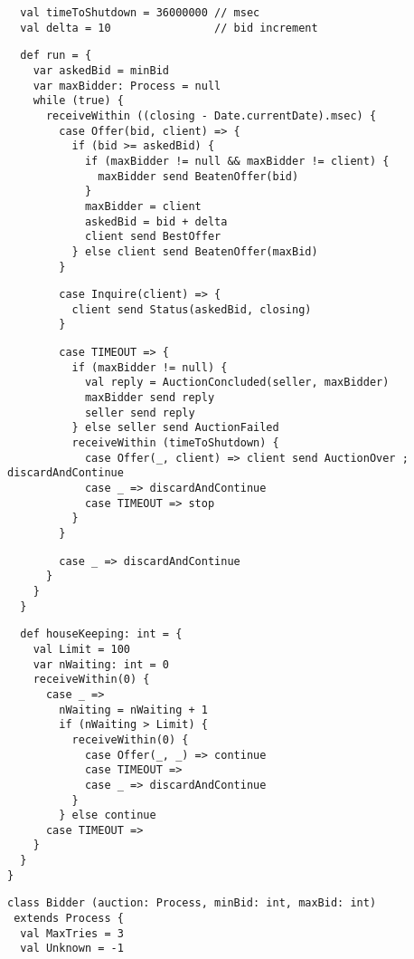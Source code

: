 \documentclass[a4paper,12pt,twoside,titlepage]{book}
\begin{document}
{{\begin{lstlisting}
  val timeToShutdown = 36000000 // msec
  val delta = 10                // bid increment
\end{lstlisting}
\begin{lstlisting}
  def run = {
    var askedBid = minBid
    var maxBidder: Process = null
    while (true) {
      receiveWithin ((closing - Date.currentDate).msec) {
        case Offer(bid, client) => {
          if (bid >= askedBid) {
            if (maxBidder != null && maxBidder != client) {
              maxBidder send BeatenOffer(bid)
            }
            maxBidder = client
            askedBid = bid + delta
            client send BestOffer
          } else client send BeatenOffer(maxBid)
        }
\end{lstlisting}
\begin{lstlisting}
        case Inquire(client) => {
          client send Status(askedBid, closing)
        }
\end{lstlisting}
\begin{lstlisting}
        case TIMEOUT => {
          if (maxBidder != null) {
            val reply = AuctionConcluded(seller, maxBidder)
            maxBidder send reply
            seller send reply
          } else seller send AuctionFailed
          receiveWithin (timeToShutdown) {
            case Offer(_, client) => client send AuctionOver ; discardAndContinue
            case _ => discardAndContinue
            case TIMEOUT => stop
          }
        }
\end{lstlisting}
\begin{lstlisting}
        case _ => discardAndContinue
      }
    }
  }
\end{lstlisting}
\begin{lstlisting}
  def houseKeeping: int = {
    val Limit = 100
    var nWaiting: int = 0
    receiveWithin(0) {
      case _ =>
        nWaiting = nWaiting + 1
        if (nWaiting > Limit) {
          receiveWithin(0) {
            case Offer(_, _) => continue
            case TIMEOUT =>
            case _ => discardAndContinue
          }
        } else continue
      case TIMEOUT =>
    }
  }
}
\end{lstlisting}
\begin{lstlisting}
class Bidder (auction: Process, minBid: int, maxBid: int)
 extends Process {
  val MaxTries = 3
  val Unknown = -1


\end{lstlisting}}}
\end{document}
